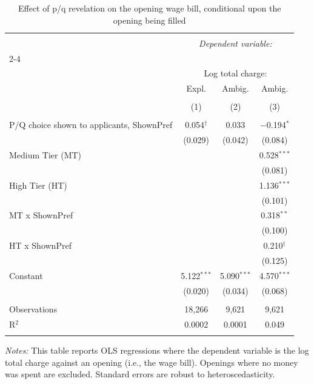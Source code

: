 
\begin{table}[!htbp] \centering 
  \caption{Effect of p/q revelation on the opening wage bill, conditional upon the opening being filled} 
  \label{tab:spend} 
\small 
\begin{tabular}{@{\extracolsep{5pt}}lccc} 
\\[-1.8ex]\hline 
\hline \\[-1.8ex] 
 & \multicolumn{3}{c}{\textit{Dependent variable:}} \\ 
\cline{2-4} 
\\[-1.8ex] & \multicolumn{3}{c}{Log total charge:} \\ 
 & Expl. & Ambig. & Ambig. \\ 
\\[-1.8ex] & (1) & (2) & (3)\\ 
\hline \\[-1.8ex] 
 P/Q choice shown to applicants, ShownPref & 0.054$^{\dagger}$ & 0.033 & $-$0.194$^{*}$ \\ 
  & (0.029) & (0.042) & (0.084) \\ 
  Medium Tier (MT) &  &  & 0.528$^{***}$ \\ 
  &  &  & (0.081) \\ 
  High Tier (HT) &  &  & 1.136$^{***}$ \\ 
  &  &  & (0.101) \\ 
  MT x ShownPref &  &  & 0.318$^{**}$ \\ 
  &  &  & (0.100) \\ 
  HT x ShownPref &  &  & 0.210$^{\dagger}$ \\ 
  &  &  & (0.125) \\ 
  Constant & 5.122$^{***}$ & 5.090$^{***}$ & 4.570$^{***}$ \\ 
  & (0.020) & (0.034) & (0.068) \\ 
 \hline \\[-1.8ex] 
Observations & 18,266 & 9,621 & 9,621 \\ 
R$^{2}$ & 0.0002 & 0.0001 & 0.049 \\ 
\hline 
\hline \\[-1.8ex] 
\end{tabular}
\begin{minipage}{0.9\textwidth} 
 \emph{Notes:} This table reports OLS regressions where the dependent variable is the log total charge against an opening (i.e., the wage bill).
Openings where no money was spent are excluded.
Standard errors are robust to heteroscedasticity.  \starlanguage
 \end{minipage}
\end{table}
